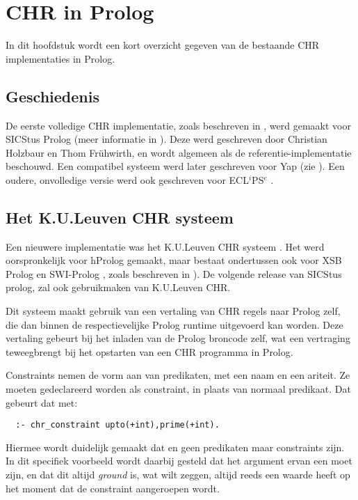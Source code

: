 \chapter{CHR in Prolog}

In dit hoofdstuk wordt een kort overzicht gegeven van de bestaande CHR implementaties in Prolog.

\section{Geschiedenis}

De eerste volledige CHR implementatie, zoals beschreven in \cite{christian:system}, werd gemaakt voor SICStus Prolog (meer informatie in \cite{sicstus}). Deze werd geschreven door Christian Holzbaur en Thom Fr\"uhwirth, en wordt algemeen als de referentie-implementatie beschouwd. Een compatibel systeem werd later geschreven voor Yap (zie \cite{yap}). Een oudere, onvolledige versie werd ook geschreven voor ECL$^i$PS$^e$ \cite{eclipse}.

\section{Het K.U.Leuven CHR systeem}

Een nieuwere implementatie was het K.U.Leuven CHR systeem \cite{tom:kulchr}. Het werd oorspronkelijk voor hProlog gemaakt, maar bestaat ondertussen ook voor XSB Prolog \cite{xsb} en SWI-Prolog \cite{swiprolog}, zoals beschreven in \cite{tom:swi:wclp2005}). De volgende release van SICStus prolog, zal ook gebruikmaken van K.U.Leuven CHR.

Dit systeem maakt gebruik van een vertaling van CHR regels naar Prolog zelf, die dan binnen de respectievelijke Prolog runtime uitgevoerd kan worden. Deze vertaling gebeurt bij het inladen van de Prolog broncode zelf, wat een vertraging teweegbrengt bij het opstarten van een CHR programma in Prolog.

Constraints nemen de vorm aan van predikaten, met een naam en een ariteit. Ze moeten gedeclareerd worden als constraint, in plaats van normaal predikaat. Dat gebeurt dat met: \begin{Verbatim}
  :- chr_constraint upto(+int),prime(+int).
\end{Verbatim}
Hiermee wordt duidelijk gemaakt dat  en  geen predikaten maar constraints zijn. In dit specifiek voorbeeld wordt daarbij gesteld dat het argument ervan een  moet zijn, en dat dit altijd {\em ground} is, wat wilt zeggen, altijd reeds een waarde heeft op het moment dat de constraint aangeroepen wordt.

